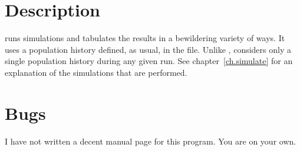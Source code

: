 \section{Description}

 runs simulations and tabulates the results in a bewildering
variety of ways.  It uses a population history defined, as usual, in
the  file.  Unlike ,  considers
only a single population history during any given run.  See
chapter~\ref{ch.simulate} for an explanation of the simulations that
are performed.

\section{Bugs}

I have not written a decent manual page for this program.  You are on
your own.

